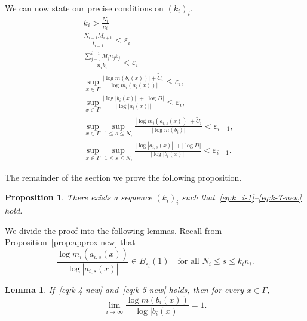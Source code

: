 \documentclass[english, 10pt]{amsart}
\numberwithin{equation}{section}
\theoremstyle{definition}
\theoremstyle{plain}
\newtheorem{lemma}[definition]{Lemma}
\newtheorem{proposition}[definition]{Proposition}
\theoremstyle{plain}
\theoremstyle{definition}
\theoremstyle{definition}
\theoremstyle{plain}
\theoremstyle{definition}
\newcommand{\eps}{\varepsilon}
\numberwithin{equation}{section}
\begin{document}
We can now state our precise conditions on $(k_i)_i$.
\begin{align}
  \label{eq:k_i-1}
  & k_i > \frac{ N_i }{ n_i } \\
  \label{eq:k_i-2}
  & \frac{ N_{i + 1 } M_{ i + 1 } }{ t_{i+1} } < \eps_i \\
  \label{eq:k_i-3}
  & \frac{ \sum_{ j = 0 }^{i - 1} M_j n_j k_j }{ n_{i} k_{i}} < \eps_i \\
  \label{eq:k-4-new}
  &\sup_{x \in \Gamma}
  \frac{ |\log m (b_{i} (x)) | + \widetilde C_{i} }{ |\log m_i (a_i (x) )| }
  \le \eps_i, \\
  \label{eq:k-5-new}
  &\sup_{ x \in \Gamma}
   \frac{ \big|\log |b_i (x) |\big| +  |\log D| }{\big|\log |a_i(x)|\big|}
  \le \eps_i
  , \\
  \label{eq:k-6-new}
  &\sup_{x \in \Gamma}
  \sup_{1 \le s \le N_i}
  \frac{|\log m_i( a_{i,s} (x) )| + \widetilde C_{i} }{  | \log m (b_i) |  }
  <\eps_{i-1}
  , \\
  \label{eq:k-7-new}
  &\sup_{ x \in \Gamma }
  \sup_{1 \le s \le N_i}
  \frac{\big|\log |a_{i,s}(x)|\big| + |\log D| }{ \big| \log |b_i(x)|\big| } < \eps_{i - 1}.
\end{align}

The remainder of the section we prove the following proposition.

\begin{proposition}\label{prop:ki}
  There exists a sequence $(k_i)_i$ such that~\eqref{eq:k_i-1}--\eqref{eq:k-7-new} hold.
\end{proposition}

We divide the proof into the following lemmas. Recall from Proposition~\ref{prop:approx-new} that
\begin{equation} \label{eq:geom-meas-uni}
  \frac{ \log m_i (a_{i,s} (x)) }{ \log |a_{i,s} (x)| } \in B_{\eps_i} ( 1 )
  \quad \text{for all } N_i \le s \le k_i n_i
  .
\end{equation}

\begin{lemma}\label{lem:bi-1}
  If~\eqref{eq:k-4-new} and~\eqref{eq:k-5-new} holds, then for every $x \in \Gamma$,
  \[
    \lim_{ i \to \infty }
    \frac{ \log m ( b_{ i } (x) ) }{ \log | b_{ i} (x) | }
    = 1
    .
  \]
\end{lemma}
\end{document}
